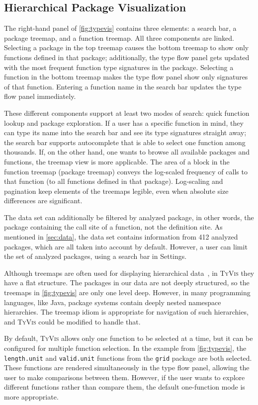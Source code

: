 \documentclass{vgtc}                          %
\newcommand{\ourmethodplaintext}{\textsc{TyVis}\xspace}
\newcommand{\ourmethod}{{\sc \ourmethodplaintext}\xspace}
\newcommand{\pkgNumAnalyzed}{412\xspace}
\newcommand{\settingsTab}{{\sc Settings}\xspace}
\begin{document}
\subsection{Hierarchical Package Visualization}

The right-hand panel of \cref{fig:typevis} contains three elements: a search bar, a package treemap, and a function treemap.
All three components are linked.
Selecting a package in the top treemap causes the bottom treemap to show only functions defined in that package; additionally, the type flow panel gets updated with the most frequent function type signatures in the package.
Selecting a function in the bottom treemap makes the type flow panel show only signatures of that function.
Entering a function name in the search bar updates the type flow panel immediately.

These different components support at least two modes of search: quick function lookup and package exploration.
If a user has a specific function in mind, they can type its name into the search bar and see its type signatures straight away; the search bar supports autocomplete that is able to select one function among thousands.
If, on the other hand, one wants to browse all available packages and functions, the treemap view is more applicable.
The area of a block in the function treemap (package treemap) conveys the log-scaled frequency of calls to that function (to all functions defined in that package).
Log-scaling and pagination keep elements of the treemaps legible, even when absolute size differences are significant.

The data set can additionally be filtered by analyzed package, in other words, the package containing the call site of a function, not the definition site.
As mentioned in \cref{sec:data}, the data set contains information from \pkgNumAnalyzed analyzed packages, which are all taken into account by default.
However, a user can limit the set of analyzed packages, using a search bar in \settingsTab.

Although treemaps are often used for displaying hierarchical data~\cite{shneiderman:1992}, in \ourmethod they have a flat structure.
The packages in our data are not deeply structured, so the treemaps in \cref{fig:typevis} are only one level deep.
However, in many programming languages, like Java, package systems contain deeply nested namespace hierarchies.
The treemap idiom is appropriate for navigation of such hierarchies, and \ourmethod could be modified to handle that.

By default, \ourmethod allows only one function to be selected at a time, but it can be configured for multiple function selection.
In the example from \cref{fig:typevis}, the {\tt length.unit} and {\tt valid.unit} functions from the {\tt grid} package are both selected.
These functions are rendered simultaneously in the type flow panel, allowing the user to make comparisons between them.
However, if the user wants to explore different functions rather than compare them, the default one-function mode is more appropriate.
\end{document}
